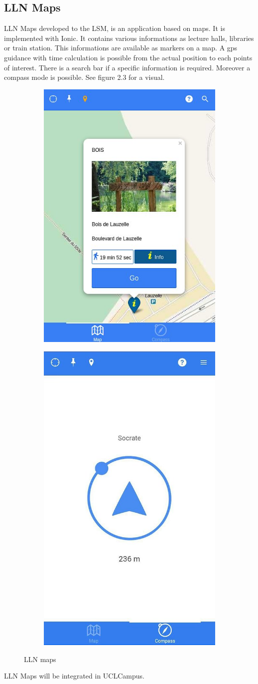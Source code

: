 \documentclass[11pt, a4paper]{report}
\begin{document}
\subsection{LLN Maps}
LLN Maps developed to the LSM, is an application based on maps. It is implemented with Ionic. It contains various informations as lecture halls, libraries or train station. This informations are available as markers on a map. A gps guidance with time calculation is possible from the actual position to each points of interest. There is a search bar if a specific information is required. Moreover a compass mode is possible. See figure 2.3 for a visual.  
\begin{figure}
\centering
\begin{subfigure}{.5\textwidth}
  \centering
  \includegraphics[width=.5\linewidth]{Images/llnmaps1.jpg}
  \label{fig:sub1}
\end{subfigure}%
\begin{subfigure}{.5\textwidth}
  \centering
  \includegraphics[width=.5\linewidth]{Images/llnmaps2.jpg}
  \label{fig:sub2}
\end{subfigure}
\caption{LLN maps}
\label{fig:test}
\end{figure}
LLN Maps will be integrated in UCLCampus. 
\end{document}
